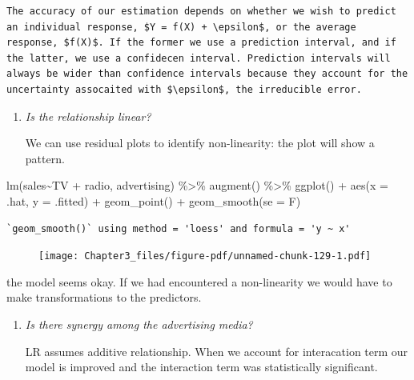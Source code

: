 \documentclass[
  letterpaper,
  DIV=11,
  numbers=noendperiod]{scrreprt}
\newenvironment{Shaded}{\begin{snugshade}}{\end{snugshade}}
\newcommand{\AttributeTok}[1]{\textcolor[rgb]{0.65,0.35,0.00}{#1}}
\newcommand{\FunctionTok}[1]{\textcolor[rgb]{0.02,0.16,0.49}{#1}}
\newcommand{\NormalTok}[1]{\textcolor[rgb]{0.33,0.33,0.33}{#1}}
\newcommand{\SpecialCharTok}[1]{\textcolor[rgb]{0.00,0.46,0.62}{#1}}
\begin{document}
\begin{verbatim}
The accuracy of our estimation depends on whether we wish to predict an individual response, $Y = f(X) + \epsilon$, or the average response, $f(X)$. If the former we use a prediction interval, and if the latter, we use a confidecen interval. Prediction intervals will always be wider than confidence intervals because they account for the uncertainty assocaited with $\epsilon$, the irreducible error.
\end{verbatim}

\begin{enumerate}
\def\labelenumi{\arabic{enumi}.}
\setcounter{enumi}{5}
\item
  \emph{Is the relationship linear?}

  We can use residual plots to identify non-linearity: the plot will
  show a pattern.
\end{enumerate}

\begin{Shaded}
\begin{Highlighting}[]
\FunctionTok{lm}\NormalTok{(sales}\SpecialCharTok{\textasciitilde{}}\NormalTok{TV }\SpecialCharTok{+}\NormalTok{ radio, advertising) }\SpecialCharTok{\%\textgreater{}\%} \FunctionTok{augment}\NormalTok{() }\SpecialCharTok{\%\textgreater{}\%} 
  \FunctionTok{ggplot}\NormalTok{() }\SpecialCharTok{+} \FunctionTok{aes}\NormalTok{(}\AttributeTok{x =}\NormalTok{ .hat, }\AttributeTok{y =}\NormalTok{ .fitted) }\SpecialCharTok{+} \FunctionTok{geom\_point}\NormalTok{() }\SpecialCharTok{+} \FunctionTok{geom\_smooth}\NormalTok{(}\AttributeTok{se =}\NormalTok{ F)}
\end{Highlighting}
\end{Shaded}

\begin{verbatim}
`geom_smooth()` using method = 'loess' and formula = 'y ~ x'
\end{verbatim}

\begin{figure}[H]

{\centering \texttt{[image: Chapter3\_files/figure-pdf/unnamed-chunk-129-1.pdf]}

}

\end{figure}

the model seems okay. If we had encountered a non-linearity we would
have to make transformations to the predictors.

\begin{enumerate}
\def\labelenumi{\arabic{enumi}.}
\setcounter{enumi}{6}
\item
  \emph{Is there synergy among the advertising media?}

  LR assumes additive relationship. When we account for interacation
  term our model is improved and the interaction term was statistically
  significant.
\end{enumerate}
\end{document}
